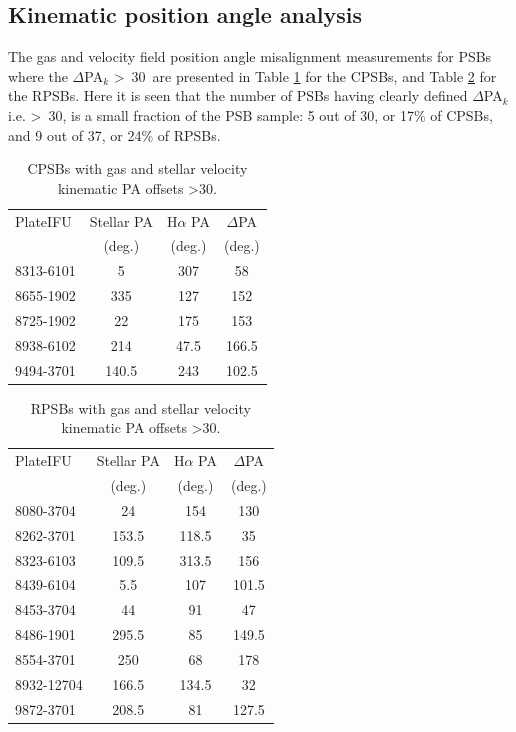 
\subsection{Kinematic position angle analysis}
\label{PA-misalignment}
The gas and velocity field position angle misalignment measurements for PSBs where the $\Delta$PA$_{k}$ \textgreater\ 30\textdegree\ are presented in Table \ref{tab:offsetCPSBs} for the CPSBs, and Table \ref{tab:offsetRPSBs} for the RPSBs. Here it is seen that the number of PSBs having clearly defined $\Delta$PA$_{k}$ i.e. \textgreater\ 30\textdegree, is a small fraction of the PSB sample: 5 out of 30, or 17\% of CPSBs, and 9 out of 37, or 24\% of RPSBs. 

\begin{table}
\centering
\caption{CPSBs with gas and stellar velocity kinematic PA offsets \textgreater 30\textdegree.}
\label{tab:offsetCPSBs}
\begin{tabular}{lccc}
\hline
PlateIFU  & Stellar PA & H$\alpha$ PA & $\Delta$PA \\
  & (deg.) & (deg.) & (deg.) \\
\hline
8313-6101 & 5 & 307 & 58 \\
8655-1902 & 335 & 127 & 152 \\
8725-1902 & 22 & 175 & 153 \\
8938-6102 & 214 & 47.5 & 166.5 \\
9494-3701 & 140.5 & 243 & 102.5 \\
\hline
\end{tabular}
\end{table}

\begin{table}
\centering
\caption[RPSBs with kinematic velocity PA offsets \textgreater 30\textdegree.]{RPSBs with gas and stellar velocity kinematic PA offsets \textgreater 30\textdegree.}
\label{tab:offsetRPSBs}
\begin{tabular}{lccc}
\hline
PlateIFU   & Stellar PA & H$\alpha$ PA & $\Delta$PA \\
  & (deg.) & (deg.) & (deg.) \\
\hline
8080-3704 & 24 & 154 & 130 \\
8262-3701 & 153.5 & 118.5 & 35 \\
8323-6103 & 109.5 & 313.5 & 156 \\
8439-6104 & 5.5 & 107 & 101.5 \\
8453-3704 & 44 & 91 & 47 \\
8486-1901 & 295.5 & 85 & 149.5 \\
8554-3701 & 250 & 68 & 178 \\
8932-12704 & 166.5 & 134.5 & 32 \\
9872-3701 & 208.5 & 81 & 127.5 \\
\hline
\end{tabular}
\end{table}

